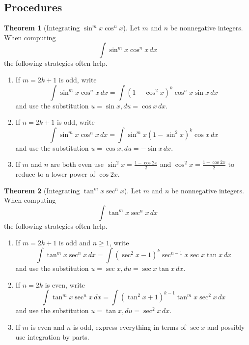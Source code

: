 \documentclass[11pt]{article}
\theoremstyle{definition}
\newtheorem*{comment}{Comment}
\theoremstyle{named}
\newtheorem*{namedtheorem}{Theorem}
\numberwithin{myalgctr}{section}
\begin{document}
\subsection*{Procedures}
\begin{comment}
The basic strategy for computing integrals of functions of the form $\sin^m x\cos^n x$ or $\tan^m x\sec^n x$ is to use one of the four substitutions
\begin{align*}
  u&=\sin x & u&=\cos x & u&=\tan x & u&=\sec x \\
  du&=\cos x\, dx & du&=-\sin x\, dx & du&=\sec^2 x\, dx & du&=\sec x\tan x\, dx,
\end{align*}
``peel off" what is necessary for $du$, and express the rest of the integrand as a polynomial in $u$ using the trigonometric identities.
\begin{align*}
\sin^2 x+\cos^2 x&=1 & \sec^2 x&=\tan^2+1.
\end{align*}
\end{comment}
\begin{namedtheorem}[Integrating $\sin^m x\cos^n x$] Let $m$ and $n$ be nonnegative integers. When computing
  \[
  \int \sin^m x\cos^n x\, dx
  \]
  the following strategies often help.
  \begin{enumerate}
    \item If $m=2k+1$ is odd, write
    \[
    \int \sin^m x\cos^n x\, dx=\int (1-\cos^2x)^k\cos^n x\sin x\, dx
    \]
    and use the substitution $u=\sin x, du=\cos x\, dx$.
    \item If $n=2k+1$ is odd, write
    \[
    \int \sin^m x\cos^n x\, dx=\int \sin^m x(1-\sin^2x)^k\cos x \, dx
    \]
    and use the substitution $u=\cos x, du=-\sin x\, dx$.
    \item If $m$ and $n$ are both even use $\displaystyle\sin^2 x=\frac{1-\cos 2x}{2}$ and $\displaystyle\cos^2 x=\frac{1+\cos 2x}{2}$ to reduce to a lower power of $\cos 2x$.
  \end{enumerate}

\end{namedtheorem}
\newpage
\begin{namedtheorem}[Integrating $\tan^m x\sec^n x$] Let $m$ and $n$ be nonnegative integers. When computing
  \[
  \int \tan^m x\sec^n x \, dx
  \]
  the following strategies often help.
  \begin{enumerate}
    \item If $m=2k+1$ is odd and $n\geq 1$, write
    \[
    \int \tan^m x\sec^n x \, dx=\int (\sec^2 x-1)^k\sec^{n-1} x\sec x\tan x \, dx
    \]
    and use the substitution $u=\sec x, du=\sec x\tan x\, dx$.
    \item If $n=2k$ is even, write
    \[
    \int \tan^m x\sec^n x \, dx=\int (\tan^2 x+1)^{k-1}\tan^m x\sec^2 x\, dx
    \]
    and use the substitution $u=\tan x, du=\sec^2 x\, dx$.

    \item If $m$ is even and $n$ is odd, express everything in terms of $\sec x$ and possibly use integration by parts.
  \end{enumerate}

\end{namedtheorem}
\end{document}
